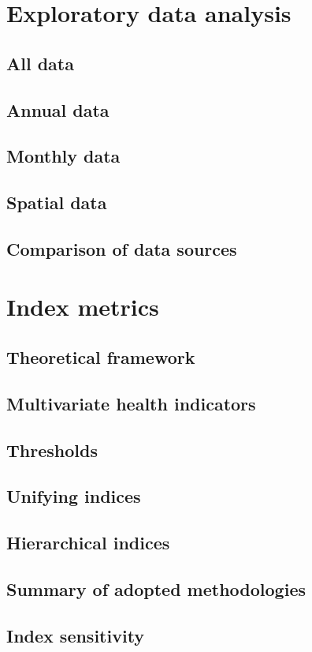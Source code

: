 \documentclass[a4paper,8pt]{AIMSreport}
\begin{document}
\section{Exploratory data analysis}
\subsection{All data}
\subsection{Annual data}
\subsection{Monthly data}
\subsection{Spatial data}
\subsection{Comparison of data sources}

\section{Index metrics}

\subsection{Theoretical framework}
\subsection{Multivariate health indicators}
\subsection{Thresholds}
\subsection{Unifying indices}
\subsection{Hierarchical indices}
\subsection{Summary of adopted methodologies}
\subsection{Index sensitivity}
\end{document}
